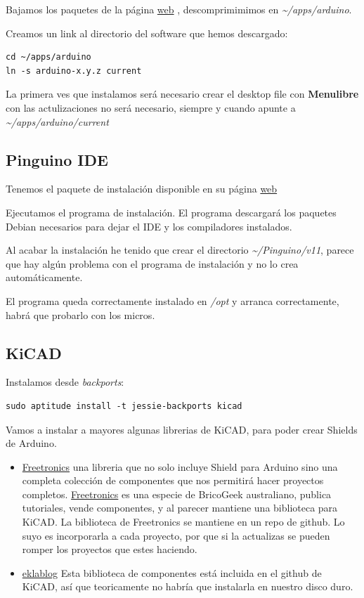\documentclass[12pt,spanish,]{article}
\providecommand{\tightlist}{%
  \setlength{\itemsep}{0pt}\setlength{\parskip}{0pt}}
\begin{document}
Bajamos los paquetes de la página \href{https://www.arduino.cc}{web} ,
descomprimimimos en \emph{\textasciitilde{}/apps/arduino}.

Creamos un link al directorio del software que hemos descargado:

\begin{verbatim}
cd ~/apps/arduino
ln -s arduino-x.y.z current
\end{verbatim}

La primera ves que instalamos será necesario crear el desktop file con
\textbf{Menulibre} con las actulizaciones no será necesario, siempre y
cuando apunte a \emph{\textasciitilde{}/apps/arduino/current}

\subsection{Pinguino IDE}\label{pinguino-ide}

Tenemos el paquete de instalación disponible en su página
\href{http://pinguino.cc/download.php}{web}

Ejecutamos el programa de instalación. El programa descargará los
paquetes Debian necesarios para dejar el IDE y los compiladores
instalados.

Al acabar la instalación he tenido que crear el directorio
\emph{\textasciitilde{}/Pinguino/v11}, parece que hay algún problema con
el programa de instalación y no lo crea automáticamente.

El programa queda correctamente instalado en \emph{/opt} y arranca
correctamente, habrá que probarlo con los micros.

\subsection{KiCAD}\label{kicad}

Instalamos desde \emph{backports}:

\begin{verbatim}
sudo aptitude install -t jessie-backports kicad
\end{verbatim}

Vamos a instalar a mayores algunas librerias de KiCAD, para poder crear
Shields de Arduino.

\begin{itemize}
\tightlist
\item
  \href{https://github.com/freetronics/freetronics_kicad_library}{Freetronics}
  una libreria que no solo incluye Shield para Arduino sino una completa
  colección de componentes que nos permitirá hacer proyectos completos.
  \href{http://www.freetronics.com}{Freetronics} es una especie de
  BricoGeek australiano, publica tutoriales, vende componentes, y al
  parecer mantiene una biblioteca para KiCAD. La biblioteca de
  Freetronics se mantiene en un repo de github. Lo suyo es incorporarla
  a cada proyecto, por que si la actualizas se pueden romper los
  proyectos que estes haciendo.
\item
  \href{http://meta-blog.eklablog.com/kicad-librairie-arduino-pretty-p930786}{eklablog}
  Esta biblioteca de componentes está incluida en el github de KiCAD,
  así que teoricamente no habría que instalarla en nuestro disco duro.
\end{itemize}
\end{document}
